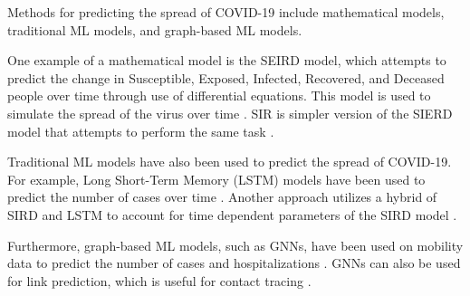 \documentclass[times, 10pt,twocolumn]{article}
\begin{document}

Methods for predicting the spread of COVID-19 include mathematical models, traditional ML models, and graph-based ML models. 

One example of a mathematical model is the SEIRD model, which attempts to predict the change in Susceptible, Exposed, Infected, Recovered, and Deceased people over time through use of differential equations. This model is used to simulate the spread of the virus over time \cite{SEIRD-LSTM}.
SIR is simpler version of the SIERD model that attempts to perform the same task \cite{SIR}.

Traditional ML models have also been used to predict the spread of COVID-19. For example, Long Short-Term Memory (LSTM) models have been used to predict the number of cases over time \cite{SEIRD-LSTM}. 
Another approach utilizes a hybrid of SIRD and LSTM to account for time dependent parameters of the SIRD model \cite{SIRD-LSTM-hybrid}.

Furthermore, graph-based ML models, such as GNNs, have been used on mobility data to predict the number of cases and hospitalizations \cite{positivity-hospitalization-GNN}.
GNNs can also be used for link prediction, which is useful for contact tracing \cite{contact-tracing-GNN}. 




\end{document}
